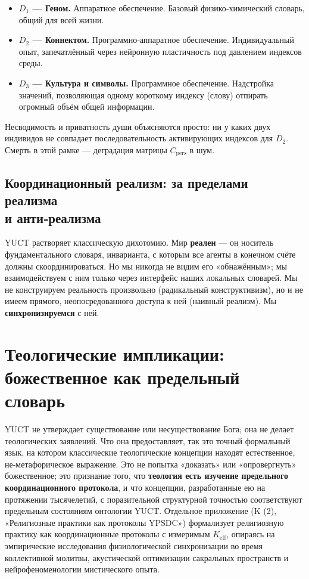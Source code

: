 \documentclass[12pt,a4paper]{article}
\begin{document}
	\begin{itemize}[leftmargin=*]
		\item \textbf{\(D_1\) — Геном.} Аппаратное обеспечение. Базовый физико‑химический словарь, общий для всей жизни.
		\item \textbf{\(D_2\) — Коннектом.} Программно‑аппаратное обеспечение. Индивидуальный опыт, запечатлённый через нейронную пластичность под давлением индексов среды.
		\item \textbf{\(D_3\) — Культура и символы.} Программное обеспечение. Надстройка значений, позволяющая одному короткому индексу (слову) отпирать огромный объём общей информации.
	\end{itemize}
	
	Несводимость и приватность души объясняются просто: ни у каких двух индивидов не совпадает последовательность активирующих индексов для \(D_2\). Смерть в этой рамке — деградация матрицы \(C_{\mathrm{pers}}\) в шум.
	
	\subsection{Координационный реализм: за пределами реализма \\ и анти‑реализма}
	
	YUCT растворяет классическую дихотомию. Мир \textbf{реален} — он носитель фундаментального словаря, инварианта, с которым все агенты в конечном счёте должны скоординироваться. Но мы никогда не видим его «обнажённым»; мы взаимодействуем с ним только через интерфейс наших локальных словарей. Мы не конструируем реальность произвольно (радикальный конструктивизм), но и не имеем прямого, неопосредованного доступа к ней (наивный реализм). Мы \textbf{синхронизируемся} с ней.
	
	\section{Теологические импликации: божественное как предельный словарь}
	\label{sec:theology}
	
	YUCT не утверждает существование или несуществование Бога; она не делает теологических заявлений. Что она предоставляет, так это точный формальный язык, на котором классические теологические концепции находят естественное, не‑метафорическое выражение. Это не попытка «доказать» или «опровергнуть» божественное; это признание того, что \textbf{теология есть изучение предельного координационного протокола}, и что концепции, разработанные ею на протяжении тысячелетий, с поразительной структурной точностью соответствуют предельным состояниям онтологии YUCT. Отдельное приложение (K (2), «Религиозные практики как протоколы YPSDC») формализует религиозную практику как координационные протоколы с измеримым \(K_{\mathrm{eff}}\), опираясь на эмпирические исследования физиологической синхронизации во время коллективной молитвы, акустической оптимизации сакральных пространств и нейрофеноменологии мистического опыта.
	
\end{document}
